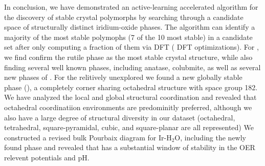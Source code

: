 


%
In conclusion, we have demonstrated an active-learning accelerated algorithm for the discovery of stable crystal polymorphs by searching through a candidate space of structurally distinct iridium-oxide phases.
%
The algorithm can identify a majority of the most stable polymophs (7 of the 10 most stable) in a candidate set after only computing a fraction of them via DFT ( DFT optimizations).
%
For \IrOtwo, we find confirm the rutile phase as the most stable crystal structure, while also finding several well known phases, including anatase, colubmite, as well as several new phases of \IrOtwo.
%
For the relitively unexplored \IrOthree we found a new globally stable phase (\aIrOthree), a completely corner sharing octahedral structure with space group 182.
%
%
We have analyzed the local and global structural coordination and revealed that octahedral coordinatiion environments are predominitly preferred, although we also have a large degree of structural diversity in our dataset (octahedral, tetrahedral, square-pyramidal, cubic, and square-planar are all represented)
%
%
We constructed a revised bulk Pourbaix diagram for Ir-H$_2$O, including the newly found \aIrOthree phase and revealed that \aIrOthree has a substantial window of stability in the OER relevent potentials and pH.

